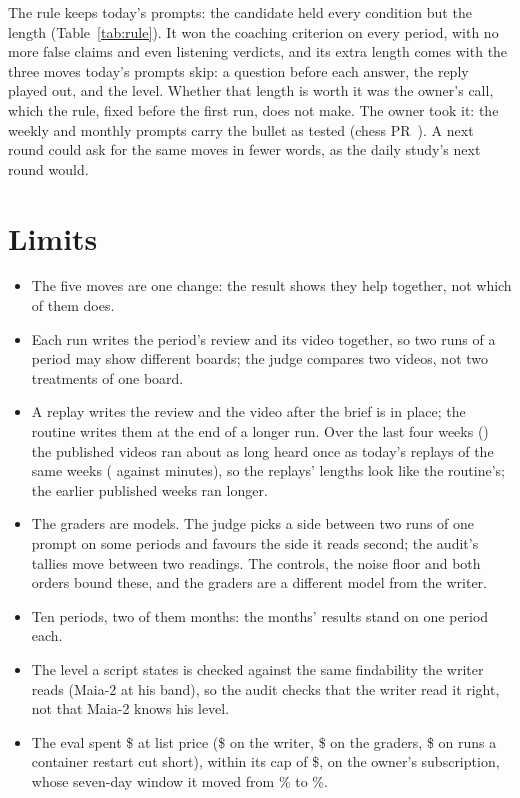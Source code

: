 \documentclass[11pt]{article}
\begin{document}
The rule keeps today's prompts: the candidate held every condition but the length
(Table~\ref{tab:rule}). It won the coaching criterion on every period, with no more false claims and
even listening verdicts, and its extra length comes with the three moves today's prompts skip: a
question before each answer, the reply played out, and the level. Whether that length is worth it was
the owner's call, which the rule, fixed before the first run, does not make. The owner took it: the
weekly and monthly prompts carry the bullet as tested (chess PR~\PortPR). A next round could ask for
the same moves in fewer words, as the daily study's next round would.

\section{Limits}

\begin{itemize}[nosep]
\item The five moves are one change: the result shows they help together, not which of them does.
\item Each run writes the period's review and its video together, so two runs of a period may show
different boards; the judge compares two videos, not two treatments of one board.
\item A replay writes the review and the video after the brief is in place; the routine writes them
at the end of a longer run. Over the last four weeks (\RecentWeeks) the published videos ran about as
long heard once as today's replays of the same weeks (\PubRecentHeard{} against \BaseRecentHeard{}
minutes), so the replays' lengths look like the routine's; the earlier published weeks ran longer.
\item The graders are models. The judge picks a side between two runs of one prompt on some periods
and favours the side it reads second; the audit's tallies move between two readings. The controls,
the noise floor and both orders bound these, and the graders are a different model from the writer.
\item Ten periods, two of them months: the months' results stand on one period each.
\item The level a script states is checked against the same findability the writer reads (Maia-2 at
his band), so the audit checks that the writer read it right, not that Maia-2 knows his level.
\item The eval spent \$\Spent{} at list price (\$\WriterSpend{} on the writer, \$\GraderSpend{} on
the graders, \$\LostSpend{} on runs a container restart cut short), within its cap of \$\Cap, on the
owner's subscription, whose seven-day window it moved from \SevenDayFirst\% to \SevenDayLast\%.
\end{itemize}
\end{document}
